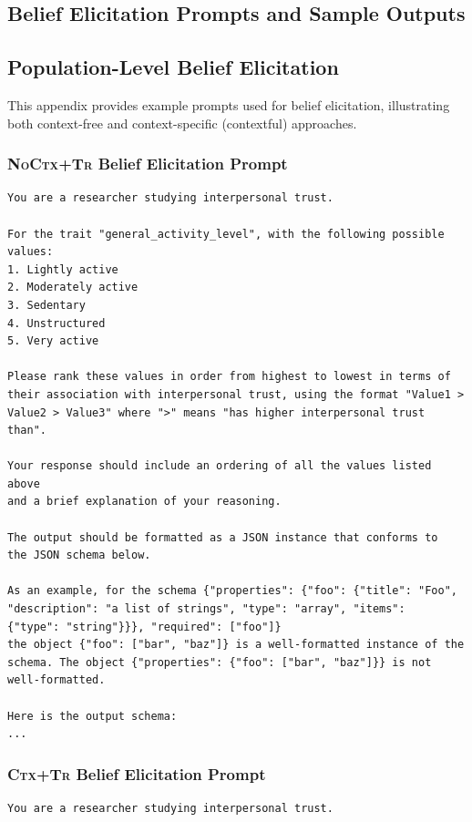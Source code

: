 \documentclass{article} %
\begin{document}
\begin{appendices}
\section{Belief Elicitation Prompts and Sample Outputs}
\label{app:elicitation}

\subsection{Population-Level Belief Elicitation}
\label{app:population-prompts}

This appendix provides example prompts used for belief elicitation, illustrating both context-free and context-specific (contextful) approaches.

\subsubsection{\textsc{NoCtx+Tr} Belief Elicitation Prompt}
\label{app:population-no-ctx}
\begin{lstlisting}[frame=single,basicstyle=\ttfamily\small,showspaces=false]
You are a researcher studying interpersonal trust.

For the trait "general_activity_level", with the following possible
values:
1. Lightly active
2. Moderately active
3. Sedentary
4. Unstructured
5. Very active

Please rank these values in order from highest to lowest in terms of 
their association with interpersonal trust, using the format "Value1 > 
Value2 > Value3" where ">" means "has higher interpersonal trust than".

Your response should include an ordering of all the values listed above
and a brief explanation of your reasoning.

The output should be formatted as a JSON instance that conforms to
the JSON schema below.

As an example, for the schema {"properties": {"foo": {"title": "Foo",
"description": "a list of strings", "type": "array", "items": 
{"type": "string"}}}, "required": ["foo"]}
the object {"foo": ["bar", "baz"]} is a well-formatted instance of the
schema. The object {"properties": {"foo": ["bar", "baz"]}} is not 
well-formatted.

Here is the output schema:
...
\end{lstlisting}

\subsubsection{\textsc{Ctx+Tr} Belief Elicitation Prompt}
\label{app:population-ctx-tr}
\begin{lstlisting}[frame=single,basicstyle=\ttfamily\small,showspaces=false]
You are a researcher studying interpersonal trust.


\end{lstlisting}
\end{appendices}
\end{document}
